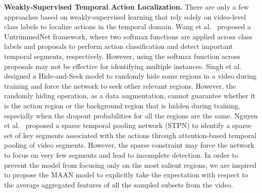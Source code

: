 \documentclass{article} \usepackage{iclr2019_conference,times}
\begin{document}
\textbf{Weakly-Supervised Temporal Action Localization.}\label{wstad} 
There are only a few approaches based on weakly-supervised learning that rely solely on video-level class labels to localize actions in the temporal domain. Wang et al.~\citep{wang2017untrimmednets} proposed a UntrimmedNet framework, where two softmax functions are applied across class labels and proposals to perform action classification and detect important temporal segments, respectively. However, using the softmax function across proposals may not be effective for identifying multiple instances. Singh et al.~\citep{singh2017hide} designed a Hide-and-Seek model to randomly hide some regions in a video during training and force the network to seek other relevant regions. However, the randomly hiding operation, as a data augmentation, cannot guarantee whether it is the action region or the background region that is hidden during training, especially when the dropout probabilities for all the regions are the same. Nguyen et al.~\citep{nguyen2017weakly} proposed a sparse temporal pooling network (STPN) to identify a sparse set of key segments associated with the actions through attention-based temporal pooling of video segments. However, the sparse constraint may force the network to focus on very few segments and lead to incomplete detection. In order to prevent the model from focusing only on the most salient regions, we are inspired to propose the MAAN model to explicitly take the expectation with respect to the average aggregated features of all the sampled subsets from the video. 
\end{document}
